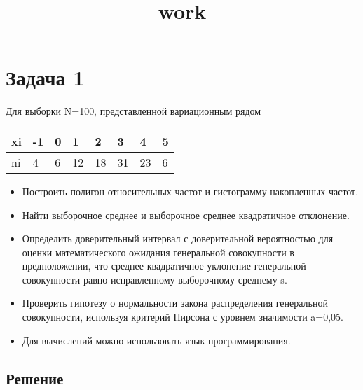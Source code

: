 \documentclass[11pt]{article}
\title{work}
\begin{document}
    
    \maketitle
    
    

    
    \section{Задача 1}\label{ux437ux430ux434ux430ux447ux430-1}

Для выборки N=100, представленной вариационным рядом

\begin{longtable}[]{@{}llllllll@{}}
\toprule\noalign{}
xi & -1 & 0 & 1 & 2 & 3 & 4 & 5 \\
\midrule\noalign{}
\endhead
\bottomrule\noalign{}
\endlastfoot
ni & 4 & 6 & 12 & 18 & 31 & 23 & 6 \\
\end{longtable}

\begin{itemize}
\item
  Построить полигон относительных частот и гистограмму накопленных
  частот.
\item
  Найти выборочное среднее и выборочное среднее квадратичное отклонение.
\item
  Определить доверительный интервал с доверительной вероятностью
   для оценки математического ожидания генеральной
  совокупности в предположении, что среднее квадратичное уклонение
  генеральной совокупности равно исправленному выборочному среднему s.
\item
  Проверить гипотезу о нормальности закона распределения генеральной
  совокупности, используя критерий Пирсона с уровнем значимости a=0,05.
\item
  Для вычислений можно использовать язык программирования.
\end{itemize}

\subsection{Решение}\label{ux440ux435ux448ux435ux43dux438ux435}
\end{document}
